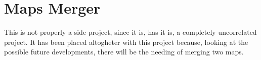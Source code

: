 \section{Maps Merger}
This is not properly a side project, since it is, has it is, a completely uncorrelated project.
It has been placed altogheter with this project because, looking at the possible future developments, there will be the needing of merging two maps.
